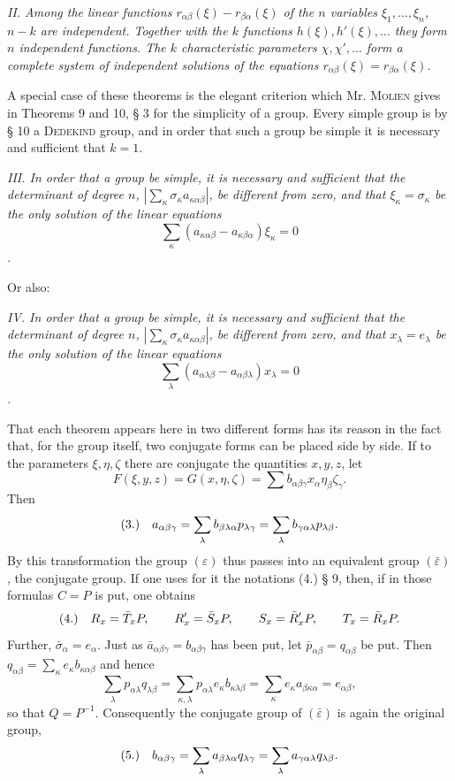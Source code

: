 \documentclass[11pt]{article}
\newcommand{\eps}{\varepsilon}
\newcommand{\fnum}[1]{\textup{(\ensuremath{#1}.)}\quad}
\begin{document}
\emph{II. Among the linear functions $r_{\alpha\beta}(\xi)-r_{\beta\alpha}(\xi)$ of the $n$ variables $\xi_1,\ldots,\xi_n$, $n-k$ are independent. Together with the $k$ functions $h(\xi),h'(\xi),\ldots$ they form $n$ independent functions. The $k$ characteristic parameters $\chi,\chi',\ldots$ form a complete system of independent solutions of the equations $r_{\alpha\beta}(\xi)=r_{\beta\alpha}(\xi)$.}

A special case of these theorems is the elegant criterion which Mr. \textsc{Molien} gives in Theorems 9 and 10, § 3 for the simplicity of a group. Every simple group is by § 10 a \textsc{Dedekind} group, and in order that such a group be simple it is necessary and sufficient that $k=1$.

\emph{III. In order that a group be simple, it is necessary and sufficient that the determinant of degree $n$, $\left|\sum_\kappa \sigma_\kappa a_{\kappa\alpha\beta}\right|$, be different from zero, and that $\xi_\kappa=\sigma_\kappa$ be the only solution of the linear equations}
\[
 \sum_\kappa(a_{\kappa\alpha\beta}-a_{\kappa\beta\alpha})\xi_\kappa=0
\]
\emph{.}

Or also:

\emph{IV. In order that a group be simple, it is necessary and sufficient that the determinant of degree $n$, $\left|\sum_\kappa \sigma_\kappa a_{\kappa\alpha\beta}\right|$, be different from zero, and that $x_\lambda=e_\lambda$ be the only solution of the linear equations}
\[
 \sum_\lambda(a_{\alpha\lambda\beta}-a_{\alpha\beta\lambda})x_\lambda=0
\]
\emph{.}

That each theorem appears here in two different forms has its reason in the fact that, for the group itself, two conjugate forms can be placed side by side. If to the parameters $\xi,\eta,\zeta$ there are conjugate the quantities $x,y,z$, let
\[
 F(\xi,y,z)=G(x,\eta,\zeta)=\sum b_{\alpha\beta\gamma}x_\alpha\eta_\beta\zeta_\gamma.
\]
Then
\[
\fnum{3} a_{\alpha\beta\gamma}=\sum_\lambda b_{\beta\lambda\alpha}p_{\lambda\gamma}
=\sum_\lambda b_{\gamma\alpha\lambda}p_{\lambda\beta}.
\]
By this transformation the group $(\eps)$ thus passes into an equivalent group $(\bar\eps)$, the conjugate group. If one uses for it the notations (4.) § 9, then, if in those formulas $C=P$ is put, one obtains
\[
\fnum{4} R_x=\bar T_xP,
\qquad R'_x=\bar S_xP,
\qquad S_x=\bar R'_xP,
\qquad T_x=\bar R_xP.
\]
Further, $\bar\sigma_\alpha=e_\alpha$. Just as $\bar a_{\alpha\beta\gamma}=b_{\alpha\beta\gamma}$ has been put, let $\bar p_{\alpha\beta}=q_{\alpha\beta}$ be put. Then $q_{\alpha\beta}=\sum_\kappa e_\kappa b_{\kappa\alpha\beta}$ and hence
\[
 \sum_\lambda p_{\alpha\lambda}q_{\lambda\beta}
 =\sum_{\kappa,\lambda}p_{\alpha\lambda}e_\kappa b_{\kappa\lambda\beta}
 =\sum_\kappa e_\kappa a_{\beta\kappa\alpha}=e_{\alpha\beta},
\]
so that $Q=P^{-1}$. Consequently the conjugate group of $(\bar\eps)$ is again the original group,
\[
\fnum{5} b_{\alpha\beta\gamma}=\sum_\lambda a_{\beta\lambda\alpha}q_{\lambda\gamma}
=\sum_\lambda a_{\gamma\alpha\lambda}q_{\lambda\beta}.
\]
\end{document}
